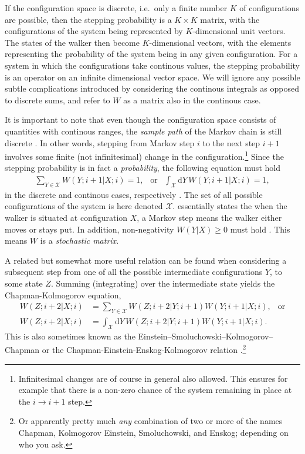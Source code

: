 \documentclass[../../master.tex]{subfiles}
\begin{document}
If the configuration space is discrete, i.e.\ only a finite number $K$ of configurations are possible, then the stepping probability is a $K\times K$ matrix, with the configurations of the system being represented by $K$-dimensional unit vectors. The states of the walker then become $K$-dimensional vectors, with  the elements representing the probability of the system being in any given configuration. For a system in which the configurations take continous values, the stepping probability is an operator on an infinite dimensional vector space. We will ignore any possible subtle complications introduced by considering the continous integrals as opposed to discrete sums, and refer to $W$ as a matrix also in the continous case.

It is important to note that even though the configuration space consists of quantities with continous ranges, the \emph{sample path} of the Markov chain is still discrete \cite{gardiner}. In other words, stepping from Markov step $i$ to the next step $i+1$ involves some finite (not infinitesimal) change in the configuration.\footnote{Infinitesimal changes are of course in general also allowed. This ensures for example that there is a non-zero chance of the system remaining in place at the $i\rightarrow i+1$ step.} Since the stepping probability is in fact a \emph{probability}, the following equation must hold
\begin{align}
\sum_{Y\in\mathcal{X}}W(Y;i+1|X;i)=1, \ \ \text{ or } \ \ \int_{\mathcal{X}}\mathrm{d}Y\,W(Y;i+1|X;i)=1, \label{eq:VMC2}
\end{align}
in the discrete and continous cases, respectively \cite{hammond}. The set of all possible configurations of the system is here denoted $\mathcal{X}$.  essentially states the when the walker is situated at configuration $X$, a Markov step means the walker either moves or stays put. In addition, non-negativity $W(Y|X)\ge0$ must hold \cite{assaraf}. This means $W$ is a \emph{stochastic matrix}. 

A related but somewhat more useful relation can be found when considering a subsequent step from one of all the possible intermediate configurations $Y$, to some state $Z$. Summing (integrating) over the intermediate state yields the Chapman-Kolmogorov equation, \cite{gardiner}
\begin{align}
W(Z;i+2|X;i) &= \sum_{Y\in\mathcal{X}}W(Z;i+2|Y;i+1)W(Y;i+1|X;i), \ \ \text{ or} \\
% 
W(Z;i+2|X;i) &= \int_{\mathcal{X}}\mathrm{d}Y\,W(Z;i+2|Y;i+1)W(Y;i+1|X;i). \label{eq:VMC3}
\end{align}
This is also sometimes known as the Einstein–Smoluchowski–Kolmogorov–Chapman or the Chapman-Einstein-Enskog-Kolmogorov relation \cite{chaichian,hjorth-jensen}.\footnote{Or apparently pretty much \emph{any} combination of two or more of the names Chapman, Kolmogorov Einstein, Smoluchowski, and Enskog; depending on who you ask.} 
\end{document}
